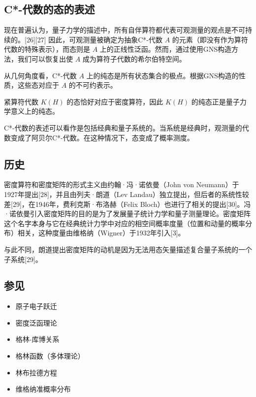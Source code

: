 \subsection{C*-代数的态的表述}
现在普遍认为，量子力学的描述中，所有自伴算符都代表可观测量的观点是不可持续的。[26][27] 因此，可观测量被确定为抽象C*-代数 \( A \) 的元素（即没有作为算符代数的特殊表示），而态则是 \( A \) 上的正线性泛函。然而，通过使用GNS构造方法，我们可以恢复出使 \( A \) 成为算符子代数的希尔伯特空间。

从几何角度看，C*-代数 \( A \) 上的纯态是所有状态集合的极点。根据GNS构造的性质，这些态对应于 \( A \) 的不可约表示。

紧算符代数 \( K(H) \) 的态恰好对应于密度算符，因此 \( K(H) \) 的纯态正是量子力学意义上的纯态。

C*-代数的表述可以看作是包括经典和量子系统的。当系统是经典时，观测量的代数变成了阿贝尔C*-代数。在这种情况下，态变成了概率测度。
\subsection{历史}
密度算符和密度矩阵的形式主义由约翰·冯·诺依曼（John von Neumann）于1927年提出[28]，并且由列夫·朗道（Lev Landau）独立提出，但后者的系统性较差[29]，在1946年，费利克斯·布洛赫（Felix Bloch）也进行了相关的提出[30]。冯·诺依曼引入密度矩阵的目的是为了发展量子统计力学和量子测量理论。密度矩阵这个名字本身与它在经典统计力学中对应的相空间概率度量（位置和动量的概率分布）相关，这种度量由维格纳（Wigner）于1932年引入[3]。

与此不同，朗道提出密度矩阵的动机是因为无法用态矢量描述复合量子系统的一个子系统[29]。
\subsection{参见}
\begin{itemize}
\item 原子电子跃迁
\item 密度泛函理论
\item 格林-库博关系
\item 格林函数（多体理论）
\item 林布拉德方程
\item 维格纳准概率分布
\end{itemize}